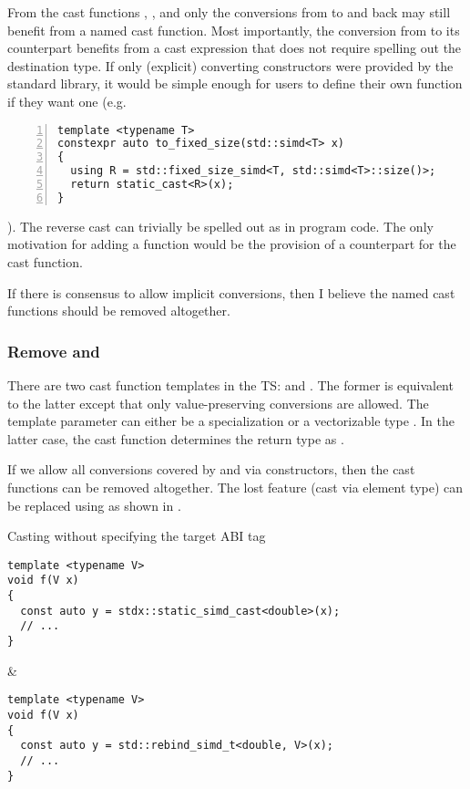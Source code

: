From the cast functions \stdx{}, \stdx{}, and
\stdx{} only the conversions from \simdabi{} to \simdabi{} and back may still benefit from a named cast
function.
Most importantly, the conversion from  to its 
counterpart benefits from a cast expression that does not require spelling out
the destination type.
If only (explicit) converting constructors were provided by the standard
library, it would be simple enough for users to define their own
 function if they want one (e.g.
\begin{lstlisting}[numbers=left,float={hbtp},label=lst:userdefined-to-fixed-size,caption={
  Example of a user-defined \code{to_fixed_size} implementation if explicit casts are provided
}]
template <typename T>
constexpr auto to_fixed_size(std::simd<T> x)
{
  using R = std::fixed_size_simd<T, std::simd<T>::size()>;
  return static_cast<R>(x);
}
\end{lstlisting}
).
The reverse cast can trivially be spelled out as 
in program code.
The only motivation for adding a  function would be the
provision of a counterpart for the  cast function.

If there is consensus to allow implicit conversions, then I believe the named
cast functions should be removed altogether.

\subsubsection{Remove  and }
There are two cast function templates in the TS:  and
.
The former is equivalent to the latter except that only value-preserving
conversions are allowed.
The template parameter can either be a  specialization or a
vectorizable type .
In the latter case, the cast function determines the return type as
.

If we allow all conversions covered by \stdx{} and
\stdx{} via \std{} constructors, then the cast
functions can be removed altogether.
The lost feature (cast via element type) can be replaced using
 as shown in .
\begin{tonytable}{Casting without specifying the target ABI tag}\label{tt:tsvsp1928casts}
  \begin{lstlisting}
template <typename V>
void f(V x)
{
  const auto y = stdx::static_simd_cast<double>(x);
  // ...
}
  \end{lstlisting}
  &
  \begin{lstlisting}
template <typename V>
void f(V x)
{
  const auto y = std::rebind_simd_t<double, V>(x);
  // ...
}
  \end{lstlisting}
\end{tonytable}%

